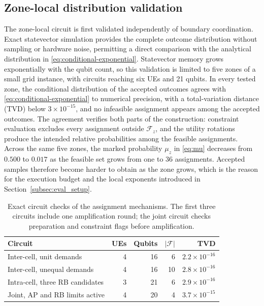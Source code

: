 %
%

\subsection{Zone-local distribution validation}
\label{subsec:eval_local_law}

The zone-local circuit is first validated independently of boundary coordination. Exact statevector simulation provides the complete outcome distribution without sampling or hardware noise, permitting a direct comparison with the analytical distribution in \eqref{eq:conditional-exponential}. Statevector memory grows exponentially with the qubit count, so this validation is limited to five zones of a small grid instance, with circuits reaching six UEs and 21 qubits. In every tested zone, the conditional distribution of the accepted outcomes agrees with \eqref{eq:conditional-exponential} to numerical precision, with a total-variation distance (TVD) below $3\times10^{-15}$, and no infeasible assignment appears among the accepted outcomes. The agreement verifies both parts of the construction: constraint evaluation excludes every assignment outside $\mathcal F_z$, and the utility rotations produce the intended relative probabilities among the feasible assignments. Across the same five zones, the marked probability $\mu_z$ in \eqref{eq:mu} decreases from $0.500$ to $0.017$ as the feasible set grows from one to $36$ assignments. Accepted samples therefore become harder to obtain as the zone grows, which is the reason for the execution budget and the local exponents introduced in Section~\ref{subsec:eval_setup}.

\begin{table}[!t]
\centering
\caption{Exact circuit checks of the assignment mechanisms. The first three circuits include one amplification round; the joint circuit checks preparation and constraint flags before amplification.}
\label{tab:eval_circuit_checks}
\footnotesize
\setlength{\tabcolsep}{3pt}
\begin{tabular}{lrrrr}
\toprule
Circuit & UEs & Qubits & $|\mathcal F|$ & TVD \\
\midrule
Inter-cell, unit demands & 4 & 16 & 6 & $2.2\times10^{-16}$ \\
Inter-cell, unequal demands & 4 & 16 & 10 & $2.8\times10^{-16}$ \\
Intra-cell, three RB candidates & 3 & 21 & 6 & $2.9\times10^{-16}$ \\
Joint, AP and RB limits active & 4 & 20 & 4 & $3.7\times10^{-15}$ \\
\bottomrule
\end{tabular}
\end{table}

